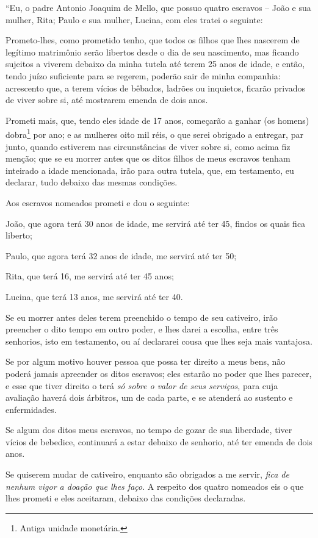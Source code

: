 ``Eu, o padre Antonio Joaquim de Mello, que possuo quatro escravos --
João e sua mulher, Rita; Paulo e sua mulher, Lucina, com eles tratei o
seguinte:

Prometo-lhes, como prometido tenho, que todos os filhos que lhes
nascerem de legítimo matrimônio serão libertos desde o dia de seu
nascimento, mas ficando sujeitos a viverem debaixo da minha tutela até
terem 25 anos de idade, e então, tendo juízo suficiente para se regerem,
poderão sair de minha companhia: acrescento que, a terem vícios de
bêbados, ladrões ou inquietos, ficarão privados de viver sobre si, até
mostrarem emenda de dois anos.

Prometi mais, que, tendo eles idade de 17 anos, começarão a ganhar (os
homens) dobra\footnote{Antiga unidade monetária.} por ano; e as
mulheres oito mil réis, o que serei obrigado a entregar, par junto,
quando estiverem nas circunstâncias de viver sobre si, como acima fiz
menção; que se eu morrer antes que os ditos filhos de meus escravos
tenham inteirado a idade mencionada, irão para outra tutela, que, em
testamento, eu declarar, tudo debaixo das mesmas condições.

Aos escravos nomeados prometi e dou o seguinte:

João, que agora terá 30 anos de idade, me servirá até ter 45, findos os
quais fica liberto;

Paulo, que agora terá 32 anos de idade, me servirá até ter 50;

Rita, que terá 16, me servirá até ter 45 anos;

Lucina, que terá 13 anos, me servirá até ter 40.

Se eu morrer antes deles terem preenchido o tempo de seu cativeiro, irão
preencher o dito tempo em outro poder, e lhes darei a escolha, entre
três senhorios, isto em testamento, ou aí declararei cousa que lhes seja
mais vantajosa.

Se por algum motivo houver pessoa que possa ter direito a meus bens, não
poderá jamais apreender os ditos escravos; eles estarão no poder que
lhes parecer, e esse que tiver direito o terá \emph{só sobre o valor de
seus serviços}, para cuja avaliação haverá dois árbitros, um de cada
parte, e se atenderá ao sustento e enfermidades.

Se algum dos ditos meus escravos, no tempo de gozar de sua liberdade,
tiver vícios de bebedice, continuará a estar debaixo de senhorio, até
ter emenda de dois anos.

Se quiserem mudar de cativeiro, enquanto são obrigados a me servir,
\emph{fica de nenhum vigor a doação que lhes faço}. A respeito dos
quatro nomeados eis o que lhes prometi e eles aceitaram, debaixo das
condições declaradas.

